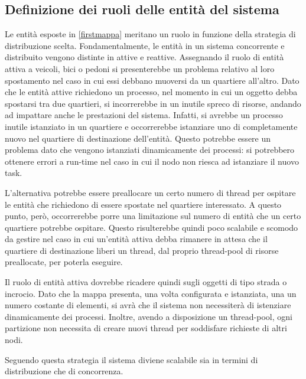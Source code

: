 \subsection{Definizione dei ruoli delle entità del sistema}
Le entità esposte in \ref{firstmappa} meritano un ruolo in funzione della
strategia di distribuzione scelta. Fondamentalmente, le entità in un sistema
concorrente e distribuito vengono distinte in attive e reattive.
Assegnando il ruolo di entità attiva a veicoli, bici o pedoni si presenterebbe
un problema relativo al loro spostamento nel caso in cui essi debbano muoversi
da un quartiere all'altro.
Dato che le entità attive richiedono un processo, nel momento in cui un oggetto
debba spostarsi tra due quartieri, si incorrerebbe in un inutile spreco di
risorse, andando ad impattare anche le prestazioni del sistema.
Infatti, si avrebbe un processo inutile istanziato in un quartiere e
occorrerebbe istanziare uno di completamente nuovo nel quartiere di destinazione
dell'entità.
Questo potrebbe essere un problema dato che vengono istanziati dinamicamente dei
processi: si potrebbero ottenere errori a run-time nel caso in cui il nodo non
riesca ad istanziare il nuovo task.

L'alternativa potrebbe essere preallocare un certo numero di thread per ospitare
le entità che richiedono di essere spostate nel quartiere interessato.
A questo punto, però, occorrerebbe porre una limitazione sul numero di entità
che un certo quartiere potrebbe ospitare.
Questo risulterebbe quindi poco scalabile e scomodo da gestire nel caso in
cui un'entità attiva debba rimanere in attesa che il quartiere di
destinazione liberi un thread, dal proprio thread-pool di risorse preallocate,
per poterla eseguire.

Il ruolo di entità attiva dovrebbe ricadere quindi sugli oggetti di tipo strada
o incrocio. 
Dato che la mappa presenta, una volta configurata e istanziata, una un numero
costante di elementi, si avrà che il sistema non necessiterà di istenziare
dinamicamente dei processi.
Inoltre, avendo a disposizione un thread-pool, ogni partizione non necessita di
creare nuovi thread per soddisfare richieste di altri nodi.

Seguendo questa strategia il sistema diviene scalabile sia in termini di
distribuzione che di concorrenza.

